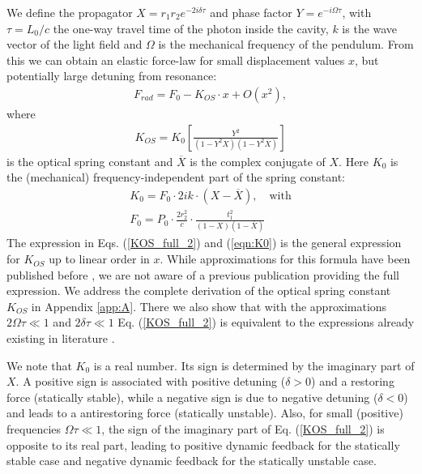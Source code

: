 We define the propagator $X=r_1r_2e^{-2i\delta\tau}$ and phase factor $Y=e^{-i\Omega\tau}$, with $\tau=L_0/c$ the one-way
travel time of the photon inside the cavity, $k$ is the wave vector of the light field  and $\Omega$ 
is the mechanical frequency of the pendulum. From this we can obtain an elastic force-law for small displacement values $x$, but potentially large detuning from resonance:
\begin{align}
\label{eqn:Frd}
F_{rad}=F_0-K_{OS}\cdot x + O(x^2),
\end{align}
where
\begin{align}
\label{KOS_full_2}
K_{OS}=K_0\left [ \frac{Y^2}{(1-Y^2X)(1-Y^2\overline{X})}  \right ]
\end{align}
is the optical spring constant and $\overline{X}$ is the complex conjugate of $X$. Here $K_0$ is the 
(mechanical) frequency-independent part of the spring constant:
\begin{align}
\label{eqn:K0}
K_0=F_0 \cdot 2 i k \cdot (X-\overline{X}),   \quad \mbox{with}\nonumber\\ 
F_0 = P_0 \cdot \frac{2  r_2^2}{c} \cdot \frac{t_1^2}{(1-X)(1-\overline{X})}
\end{align}
The expression in Eqs. (\ref{KOS_full_2}) and (\ref{eqn:K0})
is the general expression for $K_{OS}$ up to linear order in $x$. While approximations for this formula have been published before \cite{Barginsky02}, we are not aware of a previous publication providing the full expression.
We address the complete derivation of the optical spring constant $K_{OS}$ in Appendix \ref{app:A}. There we also show that with the approximations $2\Omega\tau\ll1$ and $2\delta\tau\ll1$  Eq. (\ref{KOS_full_2}) is equivalent to the expressions already existing in literature \cite{Barginsky02,Corbitt07}. 

We note that $K_0$ is a real number. Its sign is determined by the imaginary part of $X$. A positive sign is associated with positive detuning ($\delta>0$) and a restoring force (statically stable),  while a negative sign is due to  negative detuning ($\delta<0$) and
leads to a antirestoring force  (statically unstable).  Also, for small (positive) frequencies $\Omega\tau\ll1$, the sign of the imaginary part of Eq. (\ref{KOS_full_2}) is opposite to its real part, leading to positive dynamic feedback for the statically stable case and  negative dynamic feedback for the statically unstable case.

